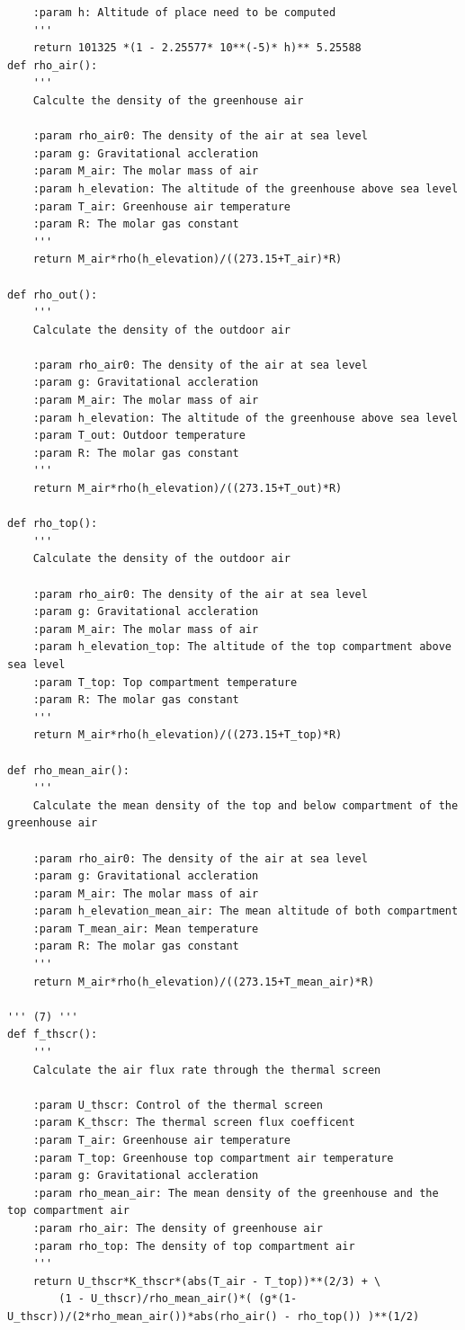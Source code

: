 \documentclass[a4paper]{article}
\begin{document}
\begin{appendices}
\begin{verbatim}
    :param h: Altitude of place need to be computed 
    '''
    return 101325 *(1 - 2.25577* 10**(-5)* h)** 5.25588
def rho_air():
    '''
    Calculte the density of the greenhouse air

    :param rho_air0: The density of the air at sea level
    :param g: Gravitational accleration
    :param M_air: The molar mass of air
    :param h_elevation: The altitude of the greenhouse above sea level
    :param T_air: Greenhouse air temperature
    :param R: The molar gas constant
    '''
    return M_air*rho(h_elevation)/((273.15+T_air)*R)

def rho_out():
    '''
    Calculate the density of the outdoor air

    :param rho_air0: The density of the air at sea level
    :param g: Gravitational accleration
    :param M_air: The molar mass of air
    :param h_elevation: The altitude of the greenhouse above sea level
    :param T_out: Outdoor temperature
    :param R: The molar gas constant
    '''
    return M_air*rho(h_elevation)/((273.15+T_out)*R)

def rho_top():
    '''
    Calculate the density of the outdoor air

    :param rho_air0: The density of the air at sea level
    :param g: Gravitational accleration
    :param M_air: The molar mass of air
    :param h_elevation_top: The altitude of the top compartment above sea level
    :param T_top: Top compartment temperature
    :param R: The molar gas constant
    '''
    return M_air*rho(h_elevation)/((273.15+T_top)*R)

def rho_mean_air():
    '''
    Calculate the mean density of the top and below compartment of the greenhouse air

    :param rho_air0: The density of the air at sea level
    :param g: Gravitational accleration
    :param M_air: The molar mass of air
    :param h_elevation_mean_air: The mean altitude of both compartment 
    :param T_mean_air: Mean temperature 
    :param R: The molar gas constant
    '''
    return M_air*rho(h_elevation)/((273.15+T_mean_air)*R)

''' (7) '''
def f_thscr():
    '''
    Calculate the air flux rate through the thermal screen 

    :param U_thscr: Control of the thermal screen
    :param K_thscr: The thermal screen flux coefficent
    :param T_air: Greenhouse air temperature
    :param T_top: Greenhouse top compartment air temperature
    :param g: Gravitational accleration
    :param rho_mean_air: The mean density of the greenhouse and the top compartment air
    :param rho_air: The density of greenhouse air
    :param rho_top: The density of top compartment air
    '''
    return U_thscr*K_thscr*(abs(T_air - T_top))**(2/3) + \
        (1 - U_thscr)/rho_mean_air()*( (g*(1-U_thscr))/(2*rho_mean_air())*abs(rho_air() - rho_top()) )**(1/2)



\end{verbatim}
\end{appendices}
\end{document}
